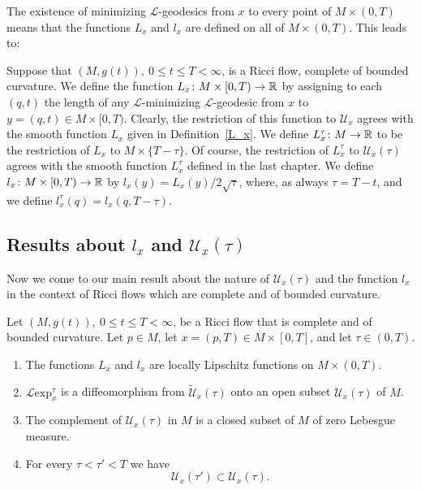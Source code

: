 The existence of minimizing ${\mathcal L}$-geodesics from $x$ to
every point of $M\times (0,T)$ means that the functions $L_{x}$ and
$l_{x}$ are defined on all of $M\times (0,T)$. This leads to:

\begin{definition}
\label{def:reduced-length-global}
 Suppose that $(M,g(t)),\ 0\le t\le T<\infty$, is a Ricci
flow, complete of bounded curvature.  We define the function
$L_{x}\colon M\times [0,T)\to \mathbb{R}$ by assigning to each $(q,t)$ the
length of any ${\mathcal L}$-minimizing ${\mathcal L}$-geodesic from
$x$ to $y=(q,t)\in M\times [0,T)$. Clearly, the restriction of this
function to ${\mathcal U}_{x}$ agrees with the smooth function
$L_{x}$ given in Definition~\ref{L_x}. We define
 $L_{x}^\tau\colon M\to \mathbb{R}$ to be the restriction of $L_x$ to
 $M\times \{T-\tau\}$.
Of course, the restriction of $L_{x}^\tau$ to ${\mathcal
U}_{x}(\tau)$ agrees with the smooth function $L_{x}^\tau$ defined
in the last chapter. We define $l_{x}\colon M\times [0,T)\to \mathbb{R}$ by
$l_{x}(y)=L_{x}(y)/2\sqrt{\tau}$, where, as always $\tau=T-t$, and
we define $l_{x}^\tau(q)=l_{x}(q,T-\tau)$.
\end{definition}





\subsection{Results about $l_{x}$ and ${\mathcal
U}_{x}(\tau)$}

Now we come to our main result about the nature of ${\mathcal
U}_{x}(\tau)$ and the function $l_{x}$
in the context of Ricci flows which are complete and of bounded
curvature.



\begin{proposition}
\label{prop:l-exp-lipschitz-complete}
\label{lipcomplete}
Let $(M,g(t)),\ 0\le t\le T<\infty$, be a Ricci flow that is
complete and of bounded curvature. Let $p\in M$, let $x=(p,T)\in
M\times [0,T]$, and let $\tau\in (0,T)$.
\begin{enumerate}
\item[(1)] The functions $L_{x}$ and $l_{x}$ are locally Lipschitz functions
on $M\times (0,T)$.
\item[(2)] ${\mathcal L}\mathrm{exp}_{x}^\tau$
 is a diffeomorphism from $\widetilde{\mathcal U}_{x}(\tau)$ onto
an open subset ${\mathcal U}_{x}(\tau)$ of $M$.
\item[(3)] The complement of ${\mathcal U}_{x}(\tau)$ in $M$ is a closed
subset of $M$ of zero Lebesgue measure. \item[(4)]
 For every
$\tau<\tau'<T$ we have
$${\mathcal U}_{x}(\tau')\subset {\mathcal U}_{x}(\tau).$$
\end{enumerate}
\end{proposition}

